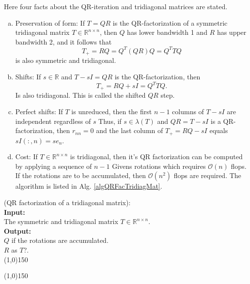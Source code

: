Here four facts about the QR-iteration and tridiagonal matrices are stated.
%
\begin{enumerate}[(a):]
\item Preservation of form: If $T=QR$ is the QR-factorization of a symmetric tridiagonal matrix
$T\in\mathbb R^{n\times n}$, then $Q$ has lower bandwidth 1 and $R$ has upper bandwidth 2, 
and it follows that
\begin{equation}
	T_+ = RQ = Q^T(QR)Q = Q^TTQ
\end{equation}
is also symmetric and tridiagonal.
\item Shifts: If $s\in\mathbb R$ and $T-sI=QR$ is the QR-factorization, then
\begin{equation}
	T_+ = RQ + sI =Q^TTQ.
\end{equation}
Is also tridiagonal. This is called the shifted $QR$ step.
\item Perfect shifts: If $T$ is unreduced, then the first $n-1$ columns of $T-sI$ are independent 
regardless of $s$ Thus, if $s\in\lambda(T)$ and $QR=T-sI$ is a QR-factorization, then $r_{nn}=0$
and the last column of $T_+=RQ-sI$ equals $sI(:,n)=se_n$.
\item Cost: If $T\in\mathbb R^{n\times n}$ is tridiagonal, then it's QR factorization can be computed
by applying a sequence of $n-1$ Givens rotations which requires $\mathcal O(n)$ flops.
If the rotations are to be accumulated, then $\mathcal O(n^2)$ flops are required.
The algorithm is listed in Alg. \ref{algQRFacTridiagMat}.
\end{enumerate}
%
%
\begin{algo}
{
%
	(QR factorization of a tridiagonal matrix):
%
}\\
\textbf{Input: }
{
%
	\\The symmetric and tridiagonal matrix $T\in\mathbb R^{n\times n}$.
%
}\\
\textbf{Output: }
{
%
	\\$Q$ if the rotations are accumulated.
	\\$R$ as $T$?.
%
}\\
\line(1,0){150}
\begin{algorithmic}
%
\EndFor{}
%
\end{algorithmic}
\label{algQRFacTridiagMat}
\line(1,0){150}
\end{algo}
%

